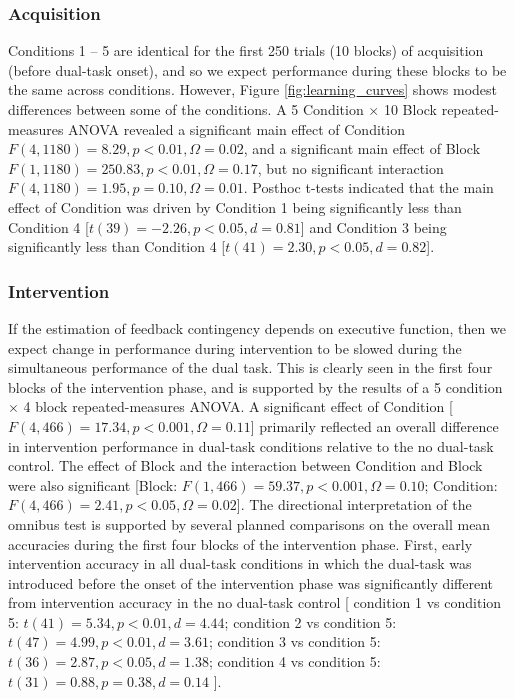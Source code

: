 \documentclass[apacite,draftfirst,man]{apa6}
\begin{document}
\subsubsection*{Acquisition}
Conditions 1 -- 5 are identical for the first 250 trials (10 blocks) of
acquisition (before dual-task onset), and so we expect performance during these
blocks to be the same across conditions. However, Figure
\ref{fig:learning_curves} shows modest differences between some of the
conditions. A 5 Condition $\times$ 10 Block repeated-measures ANOVA revealed a
significant main effect of Condition $F(4,1180) = 8.29, p < 0.01, \Omega = 0.02$,
and a significant main effect of Block $F(1,1180) = 250.83, p < 0.01, \Omega =
0.17$, but no significant interaction $F(4,1180) = 1.95, p = 0.10, \Omega =
0.01$. Posthoc t-tests indicated that the main effect of Condition was driven by
Condition 1 being significantly less than Condition 4 [$t(39) = -2.26, p < 0.05,
d = 0.81$] and Condition 3 being significantly less than Condition 4 [$t(41) =
2.30, p < 0.05, d = 0.82$].


\subsubsection*{Intervention}
If the estimation of feedback contingency depends on  executive function,
then we expect change in performance during intervention to be slowed during the
simultaneous performance of the dual task. This is clearly seen in the first
four blocks of the intervention phase, and is supported by the results of a 5
condition $\times$ 4 block repeated-measures ANOVA. A significant effect of
Condition [$F(4,466) = 17.34, p < 0.001, \Omega = 0.11$] primarily reflected an
overall difference in intervention performance in dual-task conditions relative
to the no dual-task control. The effect of Block and the interaction between
Condition and Block were also significant [Block: $F(1,466) = 59.37, p < 0.001,
\Omega = 0.10$; Condition: $F(4,466) = 2.41, p < 0.05, \Omega = 0.02$].
The directional interpretation of the omnibus test is supported by several
planned comparisons on the overall mean accuracies during the first four blocks
of the intervention phase. First, early intervention accuracy in all dual-task
conditions in which the dual-task was introduced before the onset of the
intervention phase was significantly different from intervention accuracy in the no
dual-task control
[
condition 1 vs condition 5: $t(41) = 5.34, p < 0.01, d = 4.44$;
condition 2 vs condition 5: $t(47) = 4.99, p < 0.01, d = 3.61$;
condition 3 vs condition 5: $t(36) = 2.87, p < 0.05, d = 1.38$;
condition 4 vs condition 5: $t(31) = 0.88, p = 0.38, d = 0.14$ 
].
\end{document}
